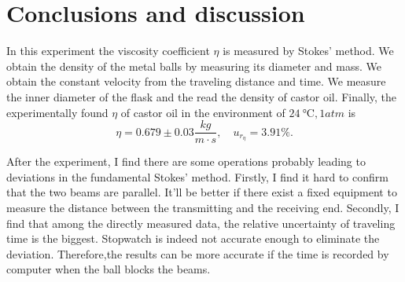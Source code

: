 \section{Conclusions and discussion}
    In this experiment the viscosity coefficient $\eta$ is measured by Stokes' method. We obtain the density of the metal balls by measuring its diameter and mass. We obtain the constant velocity from the traveling distance and time. We measure the inner diameter of the flask and the read the density of castor oil. Finally, the experimentally found $\eta$ of castor oil in the environment of $\SI{24}{\degreeCelsius}, 1 atm$ is
    \[
        \eta=0.679\pm 0.03\frac{kg}{m\cdot s}, \quad u_{r_{\eta}}=3.91\%.
    \]

    After the experiment, I find there are some operations probably leading to deviations in the fundamental Stokes' method. Firstly, I find it hard to confirm that the two beams are parallel. It'll be better if there exist a fixed equipment to measure the distance between the transmitting and the receiving end. Secondly, I find that among the directly measured data, the relative uncertainty of traveling time is the biggest. Stopwatch is indeed not accurate enough to eliminate the deviation. Therefore,the results can be more accurate if the time is recorded by computer when the ball blocks the beams.
